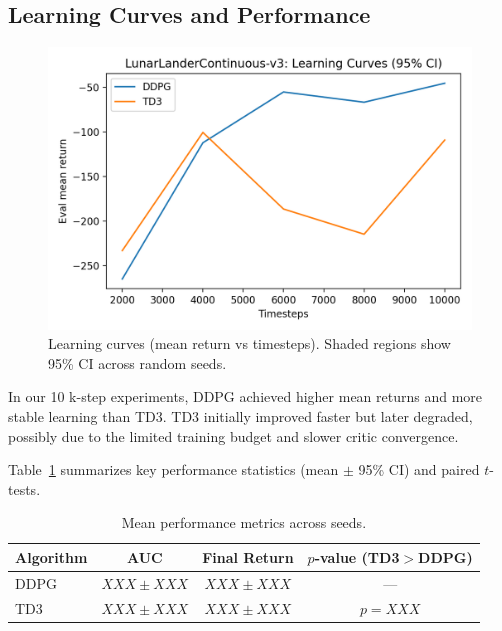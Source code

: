 \documentclass[10pt,letterpaper]{article}
\begin{document}
\subsection{Learning Curves and Performance}
\begin{figure}[h]
  \centering
  \includegraphics[width=.85\linewidth]{fig_learning_curves.png}
  \caption{Learning curves (mean return vs timesteps). Shaded regions show 95\% CI across random seeds.}
\end{figure}

In our 10 k-step experiments, DDPG achieved higher mean returns and more stable learning than TD3.
TD3 initially improved faster but later degraded, possibly due to the limited training budget and slower critic convergence.

Table~\ref{tab:performance} summarizes key performance statistics (mean $\pm$ 95\% CI) and paired $t$-tests.

\begin{table}[h]
\centering
\begin{tabular}{lccc}
\toprule
Algorithm & AUC & Final Return & $p$-value (TD3$>$DDPG) \\
\midrule
DDPG & $XXX \pm XXX$ & $XXX \pm XXX$ & --- \\
TD3  & $XXX \pm XXX$ & $XXX \pm XXX$ & $p = XXX$ \\
\bottomrule
\end{tabular}
\caption{Mean performance metrics across seeds.}
\label{tab:performance}
\end{table}
\end{document}
